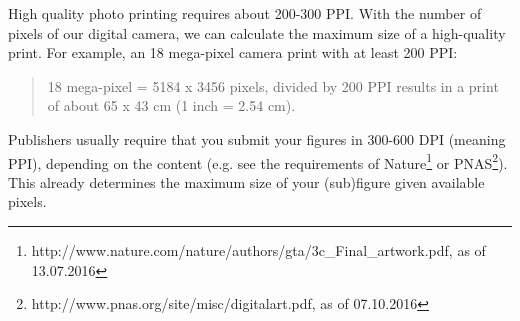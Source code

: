 High quality photo printing requires about 200-300 PPI. With the number of pixels of our digital camera, we can calculate the maximum size of a high-quality print. For example, an 18 mega-pixel camera print with at least 200 PPI: 

\begin{quotation}
	18 mega-pixel = 5184 x 3456 pixels, divided by 200 PPI results in a print of about 65 x 43 cm (1 inch = 2.54 cm).
\end{quotation}

Publishers usually require that you submit your figures in 300-600 DPI (meaning PPI), depending on the content (e.g. see the requirements of Nature\footnote{http://www.nature.com/nature/authors/gta/3c\_Final\_artwork.pdf, as of 13.07.2016} or PNAS\footnote{http://www.pnas.org/site/misc/digitalart.pdf, as of 07.10.2016}). This already determines the maximum size of your (sub)figure given available pixels. 

